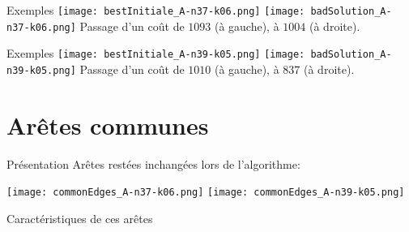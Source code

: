 \documentclass{beamer}
\begin{document}
\begin{frame}{Exemples}
\texttt{[image: bestInitiale\_A-n37-k06.png]}
\texttt{[image: badSolution\_A-n37-k06.png]}
Passage d'un coût de $1093$ (à gauche), à $1004$ (à droite).
\end{frame}

\begin{frame}{Exemples}
\texttt{[image: bestInitiale\_A-n39-k05.png]}
\texttt{[image: badSolution\_A-n39-k05.png]}
Passage d'un coût de $1010$ (à gauche), à $837$ (à droite).
\end{frame}

\section{Arêtes communes}

\begin{frame}{Présentation}
Arêtes restées inchangées lors de l'algorithme:

\begin{center}
\texttt{[image: commonEdges\_A-n37-k06.png]}
\texttt{[image: commonEdges\_A-n39-k05.png]}
\end{center}

\end{frame}

\begin{frame}{Caractéristiques de ces arêtes}

\end{frame}
\end{document}
